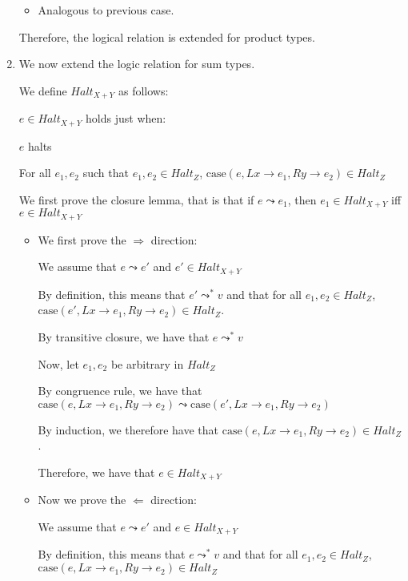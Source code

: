 \begin{enumerate}
\begin{itemize}
      \item
        Analogous to previous case.
    \end{itemize}

    Therefore, the logical relation is extended for product types.

  \item
    We now extend the logic relation for sum types.

    We define $Halt_{X + Y}$ as follows:

    $e \in Halt_{X + Y}$ holds just when:

    $e$ halts

    For all $e_1, e_2$ such that $e_1, e_2 \in Halt_Z$, $\text{case}(e, L x \rightarrow e_1, R y \rightarrow e_2) \in Halt_Z$

    We first prove the closure lemma, that is that if $e \leadsto e_1$, then $e_1 \in Halt_{X + Y}$ iff $e \in Halt_{X + Y}$


    \begin{itemize}
      \item
    We first prove the $\Rightarrow$ direction:

        We assume that $e \leadsto e'$ and $e' \in Halt_{X + Y}$

        By definition, this means that $e' \leadsto^* v$ and that for all $e_1, e_2 \in Halt_Z$, $\text{case}(e', L x \rightarrow e_1, R y \rightarrow e_2) \in Halt_Z$.

        By transitive closure, we have that $e \leadsto^* v$

        Now, let $e_1, e_2$ be arbitrary in $Halt_Z$

        By congruence rule, we have that $\text{case}(e, L x \rightarrow e_1, R y \rightarrow e_2) \leadsto \text{case}(e', L x \rightarrow e_1, R y \rightarrow e_2)$

        By induction, we therefore have that $\text{case}(e, L x \rightarrow e_1, R y \rightarrow e_2) \in Halt_Z$.

        Therefore, we have that $e \in Halt_{X + Y}$

      \item
        Now we prove the $\Leftarrow$ direction:

        We assume that $e \leadsto e'$ and $e \in Halt_{X + Y}$

        By definition, this means that $e \leadsto^* v$ and that for all $e_1, e_2 \in Halt_Z$, $\text{case}(e, L x \rightarrow e_1, R y \rightarrow e_2) \in Halt_Z$


\end{itemize}
\end{enumerate}
